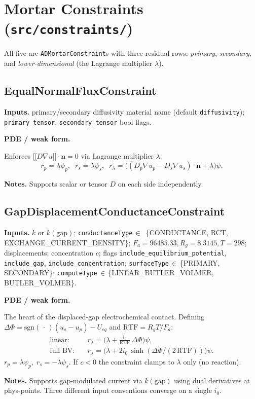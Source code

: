 \documentclass[11pt]{article}
\newcommand{\F}{F_{\!a}}            %
\newcommand{\Rg}{R_{\!g}}           %
\newcommand{\nvec}{\mathbf{n}}
\newcommand{\sgn}{\mathrm{sgn}}
\newenvironment{ecmEntry}[1]{%
  \subsection{#1}%
}{}
\newcommand{\inputsRow}[1]{\par\noindent\textbf{Inputs.} #1\par}
\newcommand{\pdeRow}[1]{\par\noindent\textbf{PDE / weak form.}\par #1\par}
\newcommand{\notesRow}[1]{\par\noindent\textbf{Notes.} #1\par}
\begin{document}
\section{Mortar Constraints (\texttt{src/constraints/})}

All five are \texttt{ADMortarConstraint}s with three residual rows: \emph{primary},
\emph{secondary}, and \emph{lower-dimensional} (the Lagrange multiplier $\lambda$).

\begin{ecmEntry}{EqualNormalFluxConstraint}
\inputsRow{primary/secondary diffusivity material name (default \texttt{diffusivity});
\texttt{primary\_tensor}, \texttt{secondary\_tensor} bool flags.}
\pdeRow{Enforces $\bigl[\!\!\bigl[D\nabla u\bigr]\!\!\bigr]\!\cdot\!\nvec = 0$ via Lagrange
multiplier $\lambda$:
\[
  r_p = \lambda\psi_p,\;\; r_s = \lambda\psi_s,\;\;
  r_\lambda = \bigl((D_p\nabla u_p - D_s\nabla u_s)\!\cdot\!\nvec + \lambda\bigr)\psi.
\]}
\notesRow{Supports scalar or tensor $D$ on each side independently.}
\end{ecmEntry}

\begin{ecmEntry}{GapDisplacementConductanceConstraint}
\inputsRow{$k$ or $k(\text{gap})$; \texttt{conductanceType}\,$\in$\,
\{CONDUCTANCE, RCT, EXCHANGE\_CURRENT\_DENSITY\};
$\F=96485.33,\Rg=8.3145,T=298$;
displacements; concentration $c$; flags
\texttt{include\_equilibrium\_potential}, \texttt{include\_gap}, \texttt{include\_concentration};
\texttt{surfaceType}\,$\in$\,\{PRIMARY, SECONDARY\};
\texttt{computeType}\,$\in$\,\{LINEAR\_BUTLER\_VOLMER, BUTLER\_VOLMER\}.}
\pdeRow{The heart of the displaced-gap electrochemical contact. Defining
$\Delta\Phi = \sgn(\,\cdot\,)(u_s - u_p) - U_{eq}$ and $\mathrm{RTF}=\Rg T/\F$:
\[
\begin{aligned}
\text{linear:}\quad& r_\lambda = \bigl(\lambda + \tfrac{i_0}{\mathrm{RTF}}\,\Delta\Phi\bigr)\psi,\\
\text{full BV:}\quad& r_\lambda = \bigl(\lambda + 2 i_0\,\sinh(\Delta\Phi/(2\,\mathrm{RTF}))\bigr)\psi.
\end{aligned}
\]
$r_p = \lambda\psi_p,\; r_s = -\lambda\psi_s$. If $c<0$ the constraint clamps to $\lambda$
only (no reaction).}
\notesRow{Supports gap-modulated current via $k(\text{gap})$ using dual derivatives at
phys-points. Three different input conventions converge on a single $i_0$.}
\end{ecmEntry}
\end{document}
